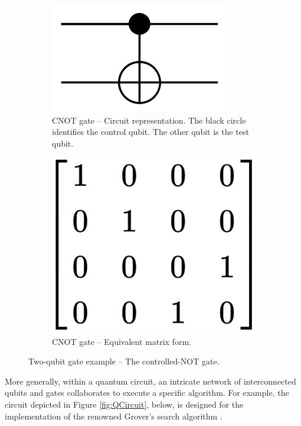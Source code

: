 \begin{figure}[htbp]
  \centering
  \begin{subfigure}[t]{0.45\textwidth}
      \centering
      \includegraphics[width=.75\textwidth]{Figures/Diagrams/CNOT_Gate.png}
      \caption{CNOT gate – Circuit representation. The black circle identifies the control qubit. The other qubit is the test qubit.}
      \label{fig:CNOT_Gate}
  \end{subfigure}
  \hfill
  \begin{subfigure}[t]{0.45\textwidth}
      \centering
      \includegraphics[width=.50\textwidth]{Figures/Diagrams/CNOT_Matrix.png}
      \caption{CNOT gate – Equivalent matrix form.}
      \label{fig:CNOT_Matrix}
  \end{subfigure}
  \caption{Two-qubit gate example – The controlled-NOT gate.}
  \label{fig:CNOT}
\end{figure}

More generally, within a quantum circuit, an intricate network of interconnected qubits and gates collaborates to execute a specific algorithm. For example, the circuit depicted in Figure \ref{fig:QCircuit}, below, is designed for the implementation of the renowned Grover's search algorithm \cite{Grover}.


